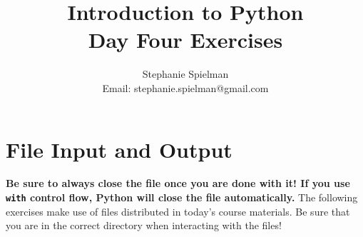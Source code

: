 \documentclass{article}[12pt]
\newcommand{\code}[1]{\texttt{#1}}  %
\begin{document}
\title{Introduction to Python \\ Day Four Exercises}
\author{Stephanie Spielman \\ \footnotesize{Email: stephanie.spielman@gmail.com}}
\date{}
\maketitle{}




\section{File Input and Output}

\textbf{Be sure to always close the file once you are done with it! If you use \code{with} control flow, Python will close the file automatically.}
The following exercises make use of files distributed in today's course materials. Be sure that you are in the correct directory when interacting with the files!
\end{document}
